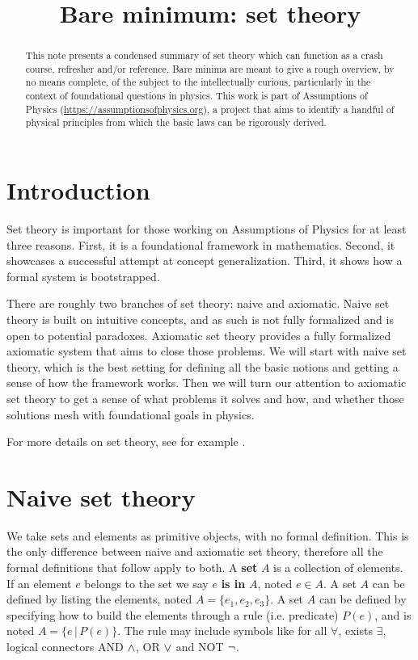 \documentclass{article}
\title{Bare minimum: set theory}
\date{\vspace{-5ex}}
\begin{document}
\maketitle


\begin{abstract}
This note presents a condensed summary of set theory which can function as a crash course, refresher and/or reference. Bare minima are meant to give a rough overview, by no means complete, of the subject to the intellectually curious, particularly in the context of foundational questions in physics. This work is part of Assumptions of Physics (\url{https://assumptionsofphysics.org}), a project that aims to identify a handful of physical principles from which the basic laws can be rigorously derived.
\end{abstract}


\section{Introduction}

Set theory is important for those working on Assumptions of Physics for at least three reasons. First, it is a foundational framework in mathematics. Second, it showcases a successful attempt at concept generalization. Third, it shows how a formal system is bootstrapped.

There are roughly two branches of set theory: naive and axiomatic. Naive set theory is built on intuitive concepts, and as such is not fully formalized and is open to potential paradoxes. Axiomatic set theory provides a fully formalized axiomatic system that aims to close those problems. We will start with naive set theory, which is the best setting for defining all the basic notions and getting a sense of how the framework works. Then we will turn our attention to axiomatic set theory to get a sense of what problems it solves and how, and whether those solutions mesh with foundational goals in physics.

For more details on set theory, see for example \cite{pinter2014book, settheory-tutorial}.

\section{Naive set theory}

We take sets and elements as primitive objects, with no formal definition. This is the only difference between naive and axiomatic set theory, therefore all the formal definitions that follow apply to both. A \textbf{set} $A$ is a collection of elements. If an element $e$ belongs to the set we say $e$ \textbf{is in} $A$, noted $ e 
\in A$. A set $A$ can be defined by listing the elements, noted $A = \{ e_1, e_2, e_3 \}$. A set $A$ can be defined by specifying how to build the elements through a rule (i.e. predicate) $P(e)$, and is noted $A = \{e \, | \,  P(e) \}$. The rule may include symbols like for all $\forall$, exists $\exists$, logical connectors AND $\wedge$, OR $\vee$ and NOT $\neg$.
\end{document}

